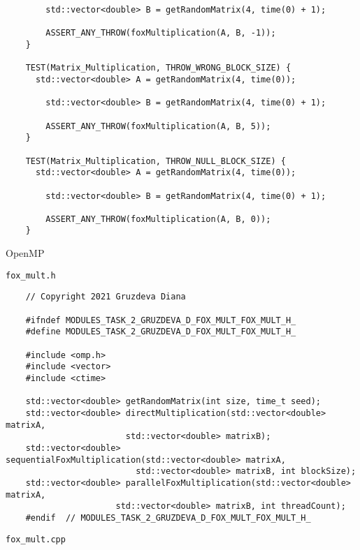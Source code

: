 \documentclass{article}
\begin{document}
\begin{lstlisting}
    	std::vector<double> B = getRandomMatrix(4, time(0) + 1);

    	ASSERT_ANY_THROW(foxMultiplication(A, B, -1));
	}

	TEST(Matrix_Multiplication, THROW_WRONG_BLOCK_SIZE) {
  	  std::vector<double> A = getRandomMatrix(4, time(0));

    	std::vector<double> B = getRandomMatrix(4, time(0) + 1);

    	ASSERT_ANY_THROW(foxMultiplication(A, B, 5));
	}

	TEST(Matrix_Multiplication, THROW_NULL_BLOCK_SIZE) {
  	  std::vector<double> A = getRandomMatrix(4, time(0));

   		std::vector<double> B = getRandomMatrix(4, time(0) + 1);

    	ASSERT_ANY_THROW(foxMultiplication(A, B, 0));
	}
\end{lstlisting}
\par
OpenMP
\par
\lstinline$fox_mult.h$
\begin{lstlisting}
	// Copyright 2021 Gruzdeva Diana

	#ifndef MODULES_TASK_2_GRUZDEVA_D_FOX_MULT_FOX_MULT_H_
	#define MODULES_TASK_2_GRUZDEVA_D_FOX_MULT_FOX_MULT_H_

	#include <omp.h>
	#include <vector>
	#include <ctime>

	std::vector<double> getRandomMatrix(int size, time_t seed);
	std::vector<double> directMultiplication(std::vector<double> matrixA,
	                    std::vector<double> matrixB);
	std::vector<double> sequentialFoxMultiplication(std::vector<double> matrixA,
 		                  std::vector<double> matrixB, int blockSize);
	std::vector<double> parallelFoxMultiplication(std::vector<double> matrixA,
  	                  std::vector<double> matrixB, int threadCount);
	#endif  // MODULES_TASK_2_GRUZDEVA_D_FOX_MULT_FOX_MULT_H_
\end{lstlisting}
\par
\lstinline$fox_mult.cpp$
\end{document}
